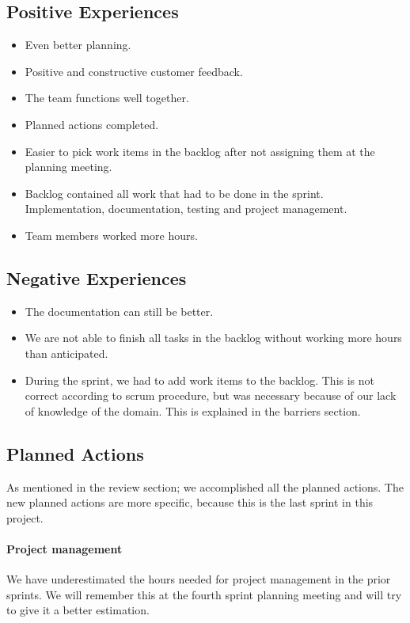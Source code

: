 \subsection{Positive Experiences}
\begin{itemize}
	\item Even better planning.
	\item Positive and constructive customer feedback.
	\item The team functions well together.
	\item Planned actions completed.
	\item Easier to pick work items in the backlog after not assigning them at the planning meeting.
	\item Backlog contained all work that had to be done in the sprint. Implementation, documentation, testing and project management.
	\item Team members worked more hours. 
\end{itemize}

\subsection{Negative Experiences}
\begin{itemize}
	\item The documentation can still be better.
	\item We are not able to finish all tasks in the backlog without working more hours than anticipated.
	\item During the sprint, we had to add work items to the backlog. This is not correct according to \Gls{scrum} procedure, but was necessary because of our lack of knowledge of the domain. This is explained in the barriers section.  
\end{itemize}

\subsection{Planned Actions}
As mentioned in the review section; we accomplished all the planned actions. The new planned actions are more specific, because this is the last sprint in this project.

\paragraph{Project management}
We have underestimated the hours needed for project management in the prior sprints. We will remember this at the fourth sprint planning meeting and will try to give it a better estimation.

